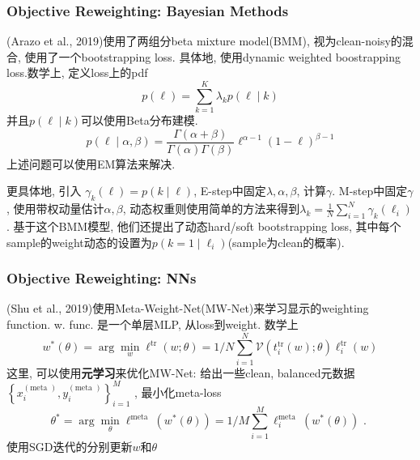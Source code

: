 \documentclass{beamer}
\newcommand{\bt}[1]{\textbf{#1}}
\begin{document}
\begin{frame}
    \frametitle{Objective Reweighting: Bayesian Methods}

    (Arazo et al., 2019)使用了两组分beta mixture model(BMM), 视为clean-noisy的混合, 使用了一个bootstrapping loss. 具体地, 使用dynamic weighted boostrapping loss.数学上, 定义loss上的pdf
    \begin{equation}
        p(\ell)=\sum_{k=1}^{K} \lambda_{k} p(\ell \mid k)
    \end{equation}
    并且$p(\ell \mid k)$可以使用Beta分布建模.
    \begin{equation}
        p(\ell \mid \alpha, \beta)=\frac{\Gamma(\alpha+\beta)}{\Gamma(\alpha) \Gamma(\beta)} \ell^{\alpha-1}(1-\ell)^{\beta-1}
    \end{equation}
    上述问题可以使用EM算法来解决.

    更具体地, 引入
    $\gamma_{k}(\ell)=p(k \mid \ell)$, 
    E-step中固定$\lambda, \alpha, \beta$, 计算$\gamma$.
    M-step中固定$\gamma$, 使用带权动量估计$\alpha, \beta$, 动态权重则使用简单的方法来得到$\lambda_{k}=\frac{1}{N} \sum_{i=1}^{N} \gamma_{k}\left(\ell_{i}\right)$. 基于这个BMM模型, 他们还提出了动态hard/soft bootstrapping loss, 其中每个sample的weight动态的设置为$p\left(k=1 \mid \ell_{i}\right)$(sample为clean的概率).

\end{frame}

\begin{frame}
    \frametitle{Objective Reweighting: NNs}

    (Shu et al., 2019)使用Meta-Weight-Net(MW-Net)来学习显示的weighting function. w. func. 是一个单层MLP, 从loss到weight. 数学上
    \begin{equation}
        w^{*}(\theta)=\arg \min _{w} \ell^{\operatorname{tr}}(w ; \theta)=1 / N \sum_{i=1}^{N} \mathcal{V}\left(t_{i}^{\operatorname{tr}}(w) ; \theta\right) \ell_{i}^{\mathrm{tr}}(w)
    \end{equation}
    这里, 可以使用\bt{元学习}来优化MW-Net: 给出一些clean, balanced元数据
    $\left\{x_{i}^{(\text {meta })}, y_{i}^{(\text {meta })}\right\}_{i=1}^{M}$
    , 最小化meta-loss
    \begin{equation}
        \theta^{*}=\arg \min _{\theta} \ell^{\text {meta }}\left(w^{*}(\theta)\right)=1 / M \sum_{i=1}^{M} \ell_{i}^{\text {meta }}\left(w^{*}(\theta)\right) \text { . }
    \end{equation}
    使用SGD迭代的分别更新$w$和$\theta$

\end{frame}
\end{document}
